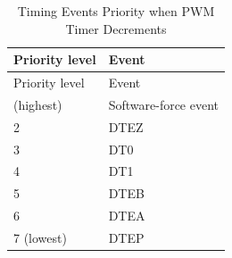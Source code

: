 \begin{longtable}[c]{|p{6cm}|p{6cm}|}
    \caption{Timing Events Priority when PWM Timer Decrements}
    \label{table:evt_prio_d}
    \\\hline
    \rowcolor{lightgray}
    Priority level
    & Event
    \\\hline
    \endfirsthead
    \hline
    \rowcolor{lightgray}   
    Priority level
    & Event
    \\\hline
    \endhead
    \hline
    \endfoot
    1 (highest)
    & Software-force event
    \\\hline
    2
    & DTEZ
    \\\hline
    3
    & DT0
    \\\hline
    4
    & DT1
    \\\hline
    5
    & DTEB
    \\\hline
    6
    & DTEA
    \\\hline
    7 (lowest)
    & DTEP
    \end{longtable}